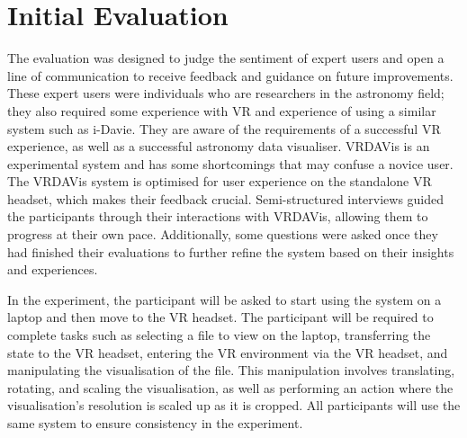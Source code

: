 \section{Initial Evaluation}
\label{sec:initial-evaluation}


The evaluation was designed to judge the sentiment of expert users and open a line of communication to receive feedback and guidance on future improvements. 
These expert users were individuals who are researchers in the astronomy field; they also required some experience with VR and experience of using a similar system such as i-Davie. 
They are aware of the requirements of a successful VR experience, as well as a successful astronomy data visualiser.
VRDAVis is an experimental system and has some shortcomings that may confuse a novice user. 
The VRDAVis system is optimised for user experience on the standalone VR headset, which makes their feedback crucial. 
Semi-structured interviews guided the participants through their interactions with VRDAVis, allowing them to progress at their own pace. 
Additionally, some questions were asked once they had finished their evaluations to further refine the system based on their insights and experiences.

In the experiment, the participant will be asked to start using the system on a laptop and then move to the VR headset. 
The participant will be required to complete tasks such as selecting a file to view on the laptop, transferring the state to the VR headset, entering the VR environment via the VR headset, and manipulating the visualisation of the file. 
This manipulation involves translating, rotating, and scaling the visualisation, as well as performing an action where the visualisation's resolution is scaled up as it is cropped. 
All participants will use the same system to ensure consistency in the experiment.

